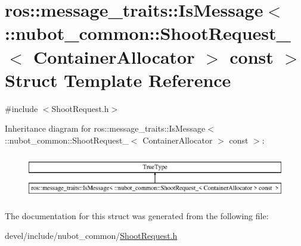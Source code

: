 \hypertarget{structros_1_1message__traits_1_1IsMessage_3_01_1_1nubot__common_1_1ShootRequest___3_01ContainerAllocator_01_4_01const_01_01_4}{\section{ros\-:\-:message\-\_\-traits\-:\-:Is\-Message$<$ \-:\-:nubot\-\_\-common\-:\-:Shoot\-Request\-\_\-$<$ Container\-Allocator $>$ const $>$ Struct Template Reference}
\label{structros_1_1message__traits_1_1IsMessage_3_01_1_1nubot__common_1_1ShootRequest___3_01ContainerAllocator_01_4_01const_01_01_4}
}


{\ttfamily \#include $<$Shoot\-Request.\-h$>$}

Inheritance diagram for ros\-:\-:message\-\_\-traits\-:\-:Is\-Message$<$ \-:\-:nubot\-\_\-common\-:\-:Shoot\-Request\-\_\-$<$ Container\-Allocator $>$ const $>$\-:\begin{figure}[H]
\begin{center}
\leavevmode
\includegraphics[height=1.978799cm]{structros_1_1message__traits_1_1IsMessage_3_01_1_1nubot__common_1_1ShootRequest___3_01ContainerAllocator_01_4_01const_01_01_4}
\end{center}
\end{figure}


The documentation for this struct was generated from the following file\-:\begin{DoxyCompactItemize}
\item 
devel/include/nubot\-\_\-common/\hyperlink{ShootRequest_8h}{Shoot\-Request.\-h}\end{DoxyCompactItemize}
